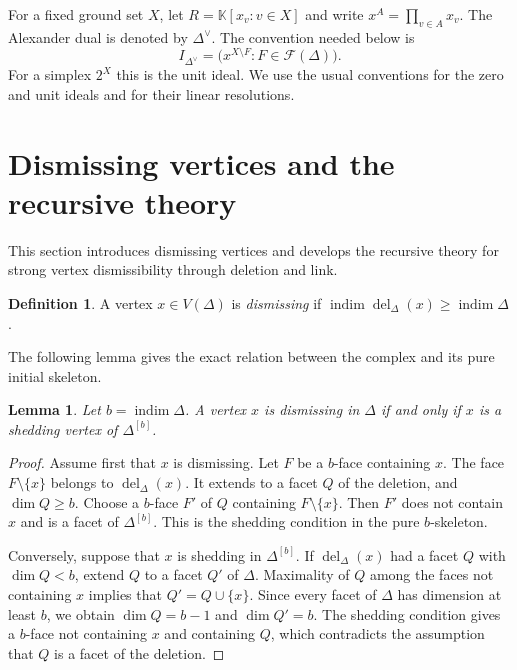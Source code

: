 \documentclass[11pt]{amsart}
\newcommand{\K}{\mathbb K}
\newcommand{\F}{\mathcal F}
\DeclareMathOperator{\indim}{indim}
\DeclareMathOperator{\del}{del}
\newtheorem{lemma}[theorem]{Lemma}
\theoremstyle{definition}
\newtheorem{definition}[theorem]{Definition}
\begin{document}
	For a fixed ground set $X$, let $R=\K[x_v:v\in X]$ and write $x^A=\prod_{v\in A}x_v$.  The Alexander dual is denoted by $\Delta^{\vee}$.  The convention needed below is
	\[
	I_{\Delta^{\vee}}
	=\bigl(x^{X\setminus F}:F\in\F(\Delta)\bigr).
	\]
	For a simplex $2^X$ this is the unit ideal.  We use the usual conventions for the zero and unit ideals and for their linear resolutions.
	
	\section{Dismissing vertices and the recursive theory}\label{sec:3}
	
	This section introduces dismissing vertices and develops the recursive theory for strong vertex dismissibility through deletion and link.
	
	\begin{definition}\label{def:1}
		A vertex $x\in V(\Delta)$ is \emph{dismissing} if $\indim\del_\Delta(x)\geq\indim\Delta$.
	\end{definition}
	
	The following lemma gives the exact relation between the complex and its pure initial skeleton.
	
	\begin{lemma}\label{lem:2}
		Let $b=\indim\Delta$.  A vertex $x$ is dismissing in $\Delta$ if and only if $x$ is a shedding vertex of $\Delta^{[b]}$.
	\end{lemma}
	
	\begin{proof}
		Assume first that $x$ is dismissing.  Let $F$ be a $b$-face containing $x$. The face $F\setminus\{x\}$ belongs to $\del_\Delta(x)$.  It extends to a facet $Q$ of the deletion, and $\dim Q\geq b$.  Choose a $b$-face $F'$ of $Q$ containing $F\setminus\{x\}$.  Then $F'$ does not contain $x$ and is a facet of $\Delta^{[b]}$.  This is the shedding condition in the pure $b$-skeleton.
		
		Conversely, suppose that $x$ is shedding in $\Delta^{[b]}$.  If $\del_\Delta(x)$ had a facet $Q$ with $\dim Q<b$, extend $Q$ to a facet $Q'$ of $\Delta$.  Maximality of $Q$ among the faces not containing $x$ implies that $Q'=Q\cup\{x\}$.  Since every facet of $\Delta$ has dimension at least $b$, we obtain $\dim Q=b-1$ and $\dim Q'=b$.  The shedding condition gives a $b$-face not containing $x$ and containing $Q$, which contradicts the assumption that $Q$ is a facet of the deletion.
	\end{proof}
	
\end{document}
